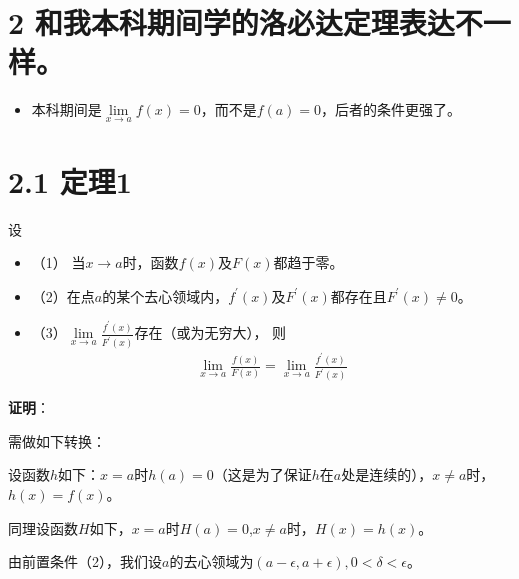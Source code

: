\documentclass{article}
\begin{document}
\section*{2 \textbf{和我本科期间学的洛必达定理表达不一样。}}

\begin{itemize}
  \item 本科期间是$\lim\limits_{x \to a} f(x) = 0$，而不是$f(a) = 0$，后者的条件更强了。
\end{itemize}


\section*{2.1 定理1}

\begin{zremark}
  设
  \begin{itemize}
    \item （1） 当$x \to a$时，函数$f(x)$及$F(x)$都趋于零。
    \item （2）在点$a$的某个去心领域内，$f^\prime(x)$及$F^\prime(x)$都存在且$F^\prime(x) \not = 0$。
    \item （3）$\lim\limits_{x \to a} \frac{f^\prime(x)}{F^\prime(x)}$存在（或为无穷大），
          则
          \begin{align*}
            \lim\limits_{x \to a} \frac{f(x)}{F(x)} = \lim\limits_{x \to a} \frac{f^\prime(x)}{F^\prime(x)}
          \end{align*}
  \end{itemize}
\end{zremark}

\textbf{证明}：

需做如下转换：

设函数$h$如下：$x = a$时$h(a) = 0$（这是为了保证$h$在$a$处是连续的），$x \not = a$时，$h(x) = f(x)$。

同理设函数$H$如下，$x = a$时$H(a) = 0$,$x \not = a$时，$H(x) = h(x)$。

由前置条件（2），我们设$a$的去心领域为$(a - \epsilon, a + \epsilon), 0 < \delta < \epsilon$。
\end{document}
